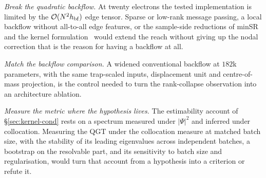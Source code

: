 \emph{Break the quadratic backflow.} At twenty electrons the tested implementation is limited
by the $\mathcal{O}(N^2 h_{\rm bf})$ edge tensor. Sparse
or low-rank message passing, a local backflow without all-to-all edge features, or the
sample-side reductions of minSR and the kernel
formulation~\cite{ChenHeyl2024-minSR,Rende2024-KernelSR} would extend the reach without
giving up the nodal correction that is the reason for having a backflow at all.

\emph{Match the backflow comparison.} A widened conventional backflow at $182$k parameters,
with the same trap-scaled inputs, displacement unit and centre-of-mass projection, is the
control needed to turn the rank-collapse observation into an architecture ablation.

\emph{Measure the metric where the hypothesis lives.} The estimability account of
\S\ref{sec:kernel-cond} rests on a spectrum measured under $|\Psi|^2$ and inferred under
collocation. Measuring the QGT under the collocation measure at matched batch size, with the
stability of its leading eigenvalues across independent batches, a bootstrap on the
resolvable part, and its sensitivity to batch size and regularisation, would turn that
account from a hypothesis into a criterion or refute it.
